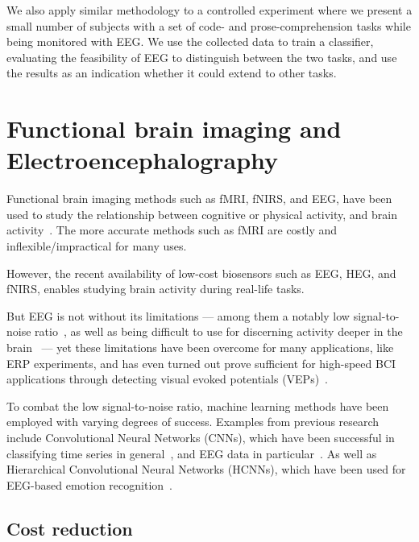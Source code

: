 We also apply similar methodology to a controlled experiment where we present a small number of subjects with a set of code- and prose-comprehension tasks while being monitored with EEG\@. We use the collected data to train a classifier, evaluating the feasibility of EEG to distinguish between the two tasks, and use the results as an indication whether it could extend to other tasks.


\section{Functional brain imaging and Electroencephalography}

    Functional brain imaging methods such as fMRI, fNIRS, and EEG, have been used to study the relationship between cognitive or physical activity, and brain activity~\cite{floyd_decoding_2017}\cite{hong_classification_2015}\cite{fucci_replication_2019}. The more accurate methods such as fMRI are costly and inflexible/impractical for many uses.

    However, the recent availability of low-cost biosensors such as EEG, HEG, and fNIRS, enables studying brain activity during real-life tasks.

    But EEG is not without its limitations --- among them a notably low signal-to-noise ratio~\cite{mcfarland_eeg-based_2017}, as well as being difficult to use for discerning activity deeper in the brain~\cite{fahimi_hnazaee_localization_2020} --- yet these limitations have been overcome for many applications, like ERP experiments, and has even turned out prove sufficient for high-speed BCI applications through detecting visual evoked potentials (VEPs)~\cite{spuler_high-speed_2017}.

    To combat the low signal-to-noise ratio, machine learning methods have been employed with varying degrees of success. Examples from previous research include Convolutional Neural Networks (CNNs), which have been successful in classifying time series in general~\cite{zhao_convolutional_2017}, and EEG data in particular~\cite{schirrmeister_deep_2017}. As well as Hierarchical Convolutional Neural Networks (HCNNs), which have been used for EEG-based emotion recognition~\cite{li_hierarchical_2018}.


    \subsection{Cost reduction}

